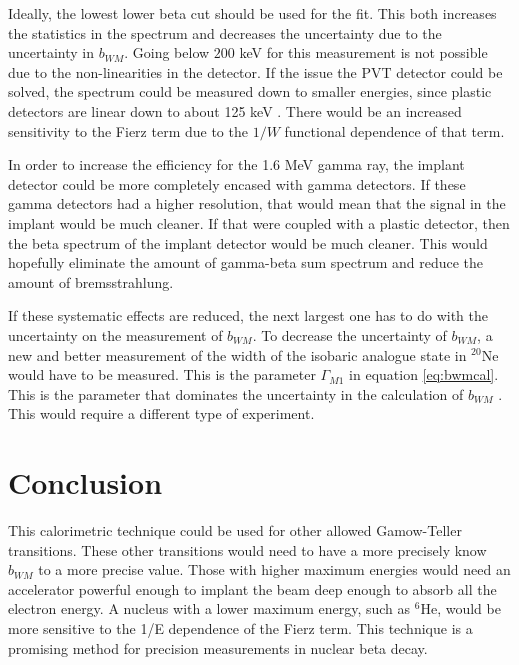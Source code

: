 \documentclass[../MaxHughesThesis.tex]{subfiles}
\begin{document}
Ideally, the lowest lower beta cut should be used for the fit.
This both increases the statistics in the spectrum and decreases the uncertainty due to the uncertainty in $b_{WM}$.
Going below $200$ keV for this measurement is not possible due to the non-linearities in the detector.
If the issue the PVT detector could be solved, the spectrum could be measured down to smaller energies, since plastic detectors are linear down to about 125 keV \cite{Kno10}. 
There would be an increased sensitivity to the Fierz term due to the $1/W$ functional dependence of that term.

In order to increase the efficiency for the 1.6 MeV gamma ray, the implant detector could be more completely encased with gamma detectors.
If these gamma detectors had a higher resolution, that would mean that the signal in the implant would be much cleaner.
If that were coupled with a plastic detector, then the beta spectrum of the implant detector would be much cleaner.
This would hopefully eliminate the amount of gamma-beta sum spectrum and reduce the amount of bremsstrahlung.

If these systematic effects are reduced, the next largest one has to do with the uncertainty on the measurement of $b_{WM}$.
To decrease the uncertainty of $b_{WM}$,  a new and better measurement of the width of the isobaric analogue state in $^{20}$Ne would have to be measured.
This is the parameter $\Gamma_{M1}$ in equation \ref{eq:bwmcal}.
This is the parameter that dominates the uncertainty in  the calculation of $b_{WM}$ \cite{Min11}.
This would require a different type of experiment.

\section{Conclusion}
This calorimetric technique could be used for other allowed Gamow-Teller transitions.
These other transitions would need to have a more precisely know $b_{WM}$ to a more precise value.
Those with higher maximum energies would need an accelerator powerful enough to implant the beam deep enough to absorb all the electron energy.
A nucleus with a lower maximum energy, such as $^{6}$He, would be more sensitive to the 1/E dependence of the Fierz term. 
This technique is a promising method for precision measurements in nuclear beta decay.
\end{document}
